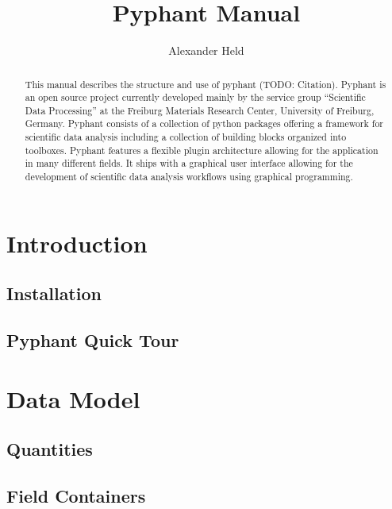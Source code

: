 \documentclass[a4paper]{article}
\begin{document}
\title{Pyphant Manual}
\author{Alexander Held}

\maketitle

\date{}

\begin{abstract}
  This manual describes the structure and use of pyphant (TODO:
  Citation). Pyphant is an open source project currently developed
  mainly by the service group ``Scientific Data Processing'' at the
  Freiburg Materials Research Center, University of Freiburg,
  Germany. Pyphant consists of a collection of python packages
  offering a framework for scientific data analysis including a
  collection of building blocks organized into toolboxes. Pyphant
  features a flexible plugin architecture allowing for the application
  in many different fields. It ships with a graphical user interface
  allowing for the development of scientific data analysis workflows
  using graphical programming.
\end{abstract}

\tableofcontents

\section{Introduction}
\label{sec:introduction}

\subsection{Installation}
\label{sec:introduction_installation}

\subsection{Pyphant Quick Tour}
\label{sec:introduction_a_quick_tour}

\section{Data Model}
\label{sec:data_model}

\subsection{Quantities}
\label{sec:data_model_quantities}

\subsection{Field Containers}
\label{sec:data_model_fcs}
\end{document}
